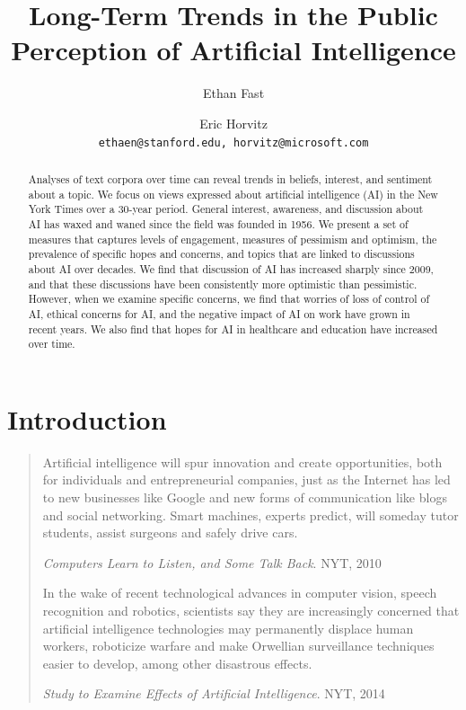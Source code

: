 \documentclass[letterpaper]{article}
\begin{document}
\title{Long-Term Trends in the Public Perception of Artificial Intelligence}
\author{Ethan Fast \and Eric Horvitz\\
  {\tt ethaen@stanford.edu, horvitz@microsoft.com}}

\maketitle
\begin{abstract}
Analyses of text corpora over time can reveal trends in beliefs, interest, and sentiment about a topic. We focus on views expressed about artificial intelligence (AI) in the New York Times over a 30-year period. General interest, awareness, and discussion about AI has waxed and waned since the field was founded in 1956. We present a set  of measures that captures levels of engagement, measures of pessimism and optimism, the prevalence of specific hopes and concerns, and topics that are linked to discussions about AI over decades. We find that discussion of AI has increased sharply since 2009, and that these discussions have been consistently more optimistic than pessimistic. However, when we examine specific concerns, we find that worries of loss of control of AI, ethical concerns for AI, and the negative impact of AI on work have grown in recent years. We also find that hopes for AI in healthcare and education have increased over time.
\end{abstract}

\section{Introduction}

\begin{quote}
\footnotesize
Artificial intelligence will spur innovation and create opportunities, both for individuals and entrepreneurial companies, just as the Internet has led to new businesses like Google and new forms of communication like blogs and social networking. Smart machines, experts predict, will someday  tutor students, assist surgeons and safely drive cars.

\textit{Computers Learn to Listen, and Some Talk Back}. NYT, 2010

In the wake of recent technological advances in computer vision, speech recognition and robotics, scientists say they are increasingly concerned that artificial intelligence technologies may permanently displace human workers, roboticize warfare and make Orwellian surveillance techniques easier to develop, among other disastrous effects.

\textit{Study to Examine Effects of Artificial Intelligence}. NYT, 2014

\normalsize
\end{quote}
\end{document}
